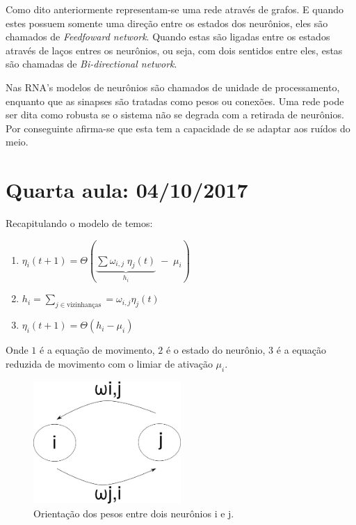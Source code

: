 Como dito anteriormente representam-se uma rede através de grafos. E quando estes possuem somente uma direção entre os estados dos neurônios, eles são chamados de \textit{Feedfoward network}. Quando estas são ligadas entre os estados através de laços entres os neurônios, ou seja, com dois sentidos entre eles, estas são chamadas de \textit{Bi-directional network}.

Nas RNA's modelos de neurônios são chamados de unidade de processamento, enquanto que as sinapses são tratadas como pesos ou conexões. Uma rede pode ser dita como robusta se o sistema não se degrada com a retirada de neurônios. Por conseguinte afirma-se que esta tem a capacidade de se adaptar aos ruídos do meio. 

\section{Quarta aula: 04/10/2017}

	Recapitulando o modelo de \citet{McCulloch1943} temos:
	
\begin{enumerate}
	\item $\eta_{i}(t+1)= \Theta\left( \underbrace{\sum \omega_{i,j}\; \eta_{j}(t)}_{h_{i}}\;-\;\mu_{i}\right)$
	\item $h_{i}=\sum_{j\in \text{vizinhanças}}=\omega_{i,j} \eta_{j}(t)$
	\item $\eta_{i}(t+1)= \Theta \left(h_{i}-\mu_{i}\right)$
\end{enumerate}

  Onde $1$ é a equação de movimento, $2$ é o estado do neurônio, $3$ é a equação reduzida de movimento com o limiar de ativação $\mu_{i}$.

\begin{figure}[H]
	\centering
	\includegraphics[width=0.5\textwidth]{Imagens/Fig15.png}
	\caption{Orientação dos pesos entre dois neurônios i e j.}
	\label{tempo}
\end{figure}
   
